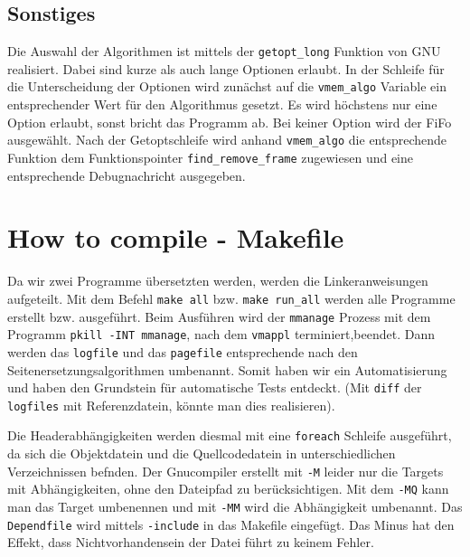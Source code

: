 \documentclass[
   draft=false
  ,paper=a4
  ,twoside=false
  ,fontsize=11pt
  ,headsepline
  ,BCOR10mm
  ,DIV11
  ,parskip=full+
]{scrartcl} %
\begin{document}
    \subsection{Sonstiges}
        Die Auswahl der Algorithmen ist mittels der \texttt{getopt\_long} 
        Funktion von GNU realisiert. 
        Dabei sind kurze als auch lange Optionen erlaubt. 
        In der Schleife für die Unterscheidung der Optionen wird zunächst 
        auf die \texttt{vmem\_algo} Variable ein entsprechender Wert für
        den Algorithmus  gesetzt. Es wird höchstens nur eine Option erlaubt, 
        sonst bricht das Programm ab. Bei keiner Option wird der FiFo 
        ausgewählt. Nach der Getoptschleife wird anhand \texttt{vmem\_algo}
        die entsprechende Funktion dem Funktionspointer 
        \texttt{find\_remove\_frame} zugewiesen und eine entsprechende 
        Debugnachricht ausgegeben.
        
\section{How to compile - Makefile}
     Da wir zwei Programme übersetzten werden, werden die Linkeranweisungen 
     aufgeteilt. Mit dem Befehl \texttt{make all} bzw. \texttt{make run\_all}
     werden alle Programme erstellt bzw. ausgeführt. Beim Ausführen wird der
     \texttt{mmanage} Prozess mit dem Programm \texttt{pkill -INT mmanage}, 
     nach dem \texttt{vmappl} terminiert,beendet. Dann werden das 
     \texttt{logfile} und das \texttt{pagefile} entsprechende nach den 
     Seitenersetzungsalgorithmen umbenannt. Somit haben wir ein 
     Automatisierung und haben den Grundstein für automatische Tests entdeckt. 
     (Mit \texttt{diff} der \texttt{logfiles} mit Referenzdatein, könnte man dies 
     realisieren).
     
     Die Headerabhängigkeiten werden diesmal mit eine \texttt{foreach} Schleife
     ausgeführt, da sich die Objektdatein und die Quellcodedatein in 
     unterschiedlichen Verzeichnissen befnden. Der Gnucompiler erstellt mit 
     \texttt{-M} leider nur die Targets mit Abhängigkeiten, ohne den Dateipfad
     zu berücksichtigen. Mit dem \texttt{-MQ} kann man das Target umbenennen 
     und mit \texttt{-MM} wird die Abhängigkeit umbenannt. 
     Das \texttt{Dependfile} wird mittels \texttt{-include} in das Makefile 
     eingefügt. Das Minus hat den Effekt, dass Nichtvorhandensein der Datei
     führt zu keinem Fehler. 
\end{document}
